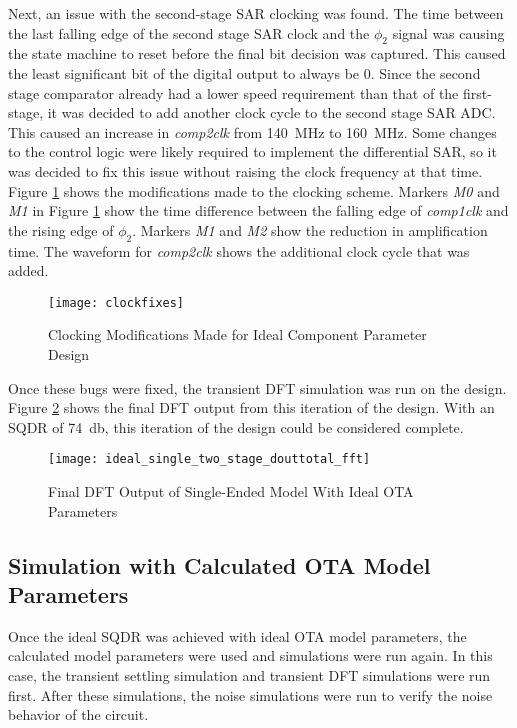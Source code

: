 Next, an issue with the second-stage SAR clocking was found. The time between the last falling edge of the second stage SAR clock and the $\phi_{2}$ signal was causing the state machine to reset before the final bit decision was captured. This caused the least significant bit of the digital output to always be 0. Since the second stage comparator already had a lower speed requirement than that of the first-stage, it was decided to add another clock cycle to the second stage SAR ADC. This caused an increase in \emph{comp2clk} from \SI{140}{\mega\hertz} to \SI{160}{\mega\hertz}. Some changes to the control logic were likely required to implement the differential SAR, so it was decided to fix this issue without raising the clock frequency at that time. Figure \ref{fig:fixedclocks} shows the modifications made to the clocking scheme. Markers \emph{M0} and \emph{M1} in Figure \ref{fig:fixedclocks} show the time difference between the falling edge of \emph{comp1clk} and the rising edge of $\phi_{2}$. Markers \emph{M1} and \emph{M2} show the reduction in amplification time. The waveform for \emph{comp2clk} shows the additional clock cycle that was added. 
\begin{figure}[htbp]
\centering
\texttt{[image: clockfixes]}
\caption{Clocking Modifications Made for Ideal Component Parameter Design}
\label{fig:fixedclocks}
\end{figure}

Once these bugs were fixed, the transient DFT simulation was run on the design. Figure \ref{fig:idealparamsingledft} shows the final DFT output from this iteration of the design. With an SQDR of \SI{74}{\decibel}, this iteration of the design could be considered complete.
\begin{figure}[htbp]
\centering
\texttt{[image: ideal\_single\_two\_stage\_douttotal\_fft]}
\caption{Final DFT Output of Single-Ended Model With Ideal OTA Parameters} 
\label{fig:idealparamsingledft}
\end{figure}
\subsection{Simulation with Calculated OTA Model Parameters}
Once the ideal SQDR was achieved with ideal OTA model parameters, the calculated model parameters were used and simulations were run again. In this case, the transient settling simulation and transient DFT simulations were run first. After these simulations, the noise simulations were run to verify the noise behavior of the circuit.

